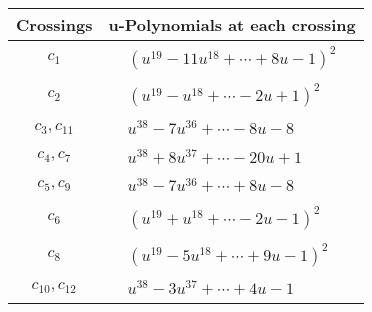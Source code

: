\documentclass[1p]{elsarticle_modified}
\theoremstyle{definition}
\begin{document}
\begin{tabular}{m{50pt}|m{274pt}}
Crossings & \hspace{64pt}u-Polynomials at each crossing \\
\hline $$\begin{aligned}c_{1}\end{aligned}$$&$\begin{aligned}
&(u^{19}-11 u^{18}+\cdots+8 u-1)^{2}
\end{aligned}$\\
\hline $$\begin{aligned}c_{2}\end{aligned}$$&$\begin{aligned}
&(u^{19}- u^{18}+\cdots-2 u+1)^{2}
\end{aligned}$\\
\hline $$\begin{aligned}c_{3},c_{11}\end{aligned}$$&$\begin{aligned}
&u^{38}-7 u^{36}+\cdots-8 u-8
\end{aligned}$\\
\hline $$\begin{aligned}c_{4},c_{7}\end{aligned}$$&$\begin{aligned}
&u^{38}+8 u^{37}+\cdots-20 u+1
\end{aligned}$\\
\hline $$\begin{aligned}c_{5},c_{9}\end{aligned}$$&$\begin{aligned}
&u^{38}-7 u^{36}+\cdots+8 u-8
\end{aligned}$\\
\hline $$\begin{aligned}c_{6}\end{aligned}$$&$\begin{aligned}
&(u^{19}+u^{18}+\cdots-2 u-1)^{2}
\end{aligned}$\\
\hline $$\begin{aligned}c_{8}\end{aligned}$$&$\begin{aligned}
&(u^{19}-5 u^{18}+\cdots+9 u-1)^{2}
\end{aligned}$\\
\hline $$\begin{aligned}c_{10},c_{12}\end{aligned}$$&$\begin{aligned}
&u^{38}-3 u^{37}+\cdots+4 u-1
\end{aligned}$\\
\hline
\end{tabular}\\~\\
\end{document}

